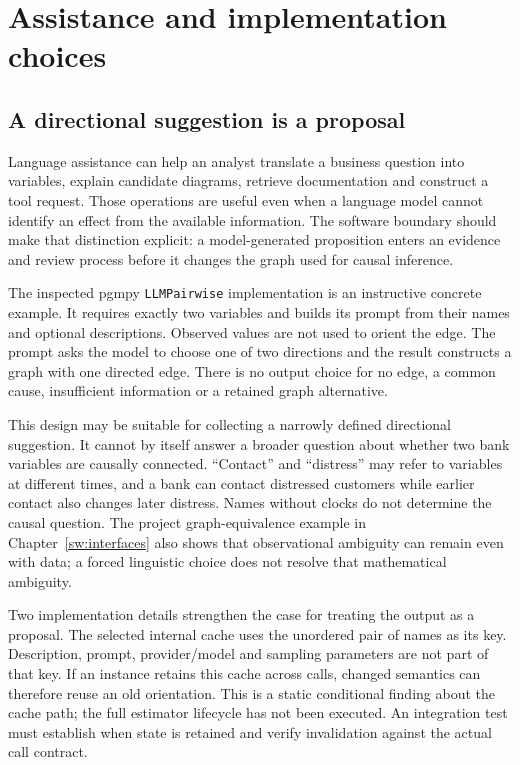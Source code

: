 \chapter{Assistance and implementation choices}
\label{sw:agents}

\section{A directional suggestion is a proposal}

Language assistance can help an analyst translate a business question into
variables, explain candidate diagrams, retrieve documentation and construct a
tool request. Those operations are useful even when a language model cannot
identify an effect from the available information. The software boundary should
make that distinction explicit: a model-generated proposition enters an evidence
and review process before it changes the graph used for causal inference.

The inspected pgmpy \texttt{LLMPairwise} implementation is an instructive
concrete example. It requires exactly two variables and builds its prompt from
their names and optional descriptions. Observed values are not used to orient
the edge. The prompt asks the model to choose one of two directions and the
result constructs a graph with one directed edge. There is no output choice
for no edge, a common cause, insufficient information or a retained graph
alternative.\cite{v12_sw_pgmpy}

This design may be suitable for collecting a narrowly defined directional
suggestion. It cannot by itself answer a broader question about whether two
bank variables are causally connected. ``Contact'' and ``distress'' may refer
to variables at different times, and a bank can contact distressed customers
while earlier contact also changes later distress. Names without clocks do
not determine the causal question. The project graph-equivalence example in
Chapter~\ref{sw:interfaces} also shows that observational ambiguity can remain
even with data; a forced linguistic choice does not resolve that mathematical
ambiguity.

Two implementation details strengthen the case for treating the output as a
proposal. The selected internal cache uses the unordered pair of names as its
key. Description, prompt, provider/model and sampling parameters are not part
of that key. If an instance retains this cache across calls, changed semantics
can therefore reuse an old orientation. This is a static conditional finding
about the cache path; the full estimator lifecycle has not been executed.
An integration test must establish when state is retained and verify
invalidation against the actual call contract.\cite{v12_sw_pgmpy}

